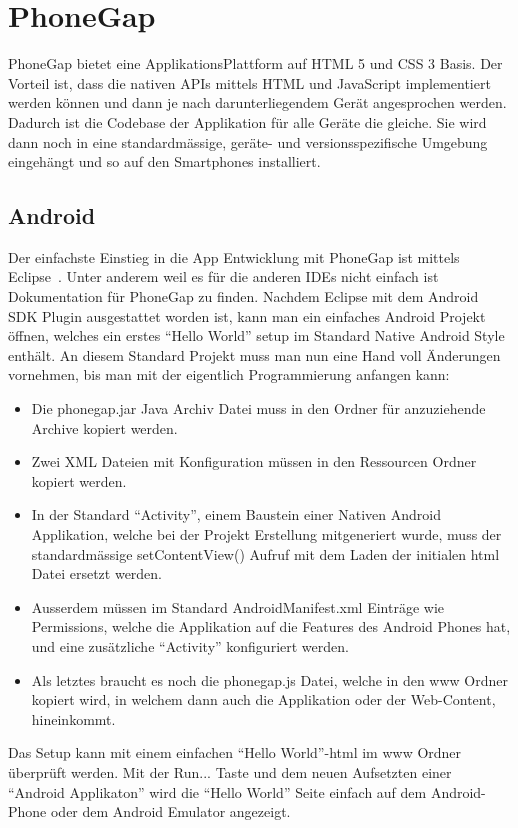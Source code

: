 
\newpage
\section{PhoneGap} %
\label{sec:PhoneGap}
PhoneGap bietet eine ApplikationsPlattform auf HTML 5 und CSS 3 Basis. Der Vorteil ist, dass die nativen APIs mittels HTML und JavaScript implementiert werden können und dann je nach darunterliegendem Gerät angesprochen werden. Dadurch ist die Codebase der Applikation für alle Geräte die gleiche. Sie wird dann noch in eine standardmässige, geräte- und versionsspezifische Umgebung eingehängt und so auf den Smartphones installiert.

\subsection{Android} %
\label{sub:android}

Der einfachste Einstieg in die App Entwicklung mit PhoneGap ist mittels Eclipse~\cite{bib:eclipse}. Unter anderem weil es für die anderen IDEs nicht einfach ist Dokumentation für PhoneGap zu finden. Nachdem Eclipse mit dem Android SDK Plugin ausgestattet worden ist, kann man ein einfaches Android Projekt öffnen, welches ein erstes "`Hello World"' setup im Standard Native Android Style enthält. 
An diesem Standard Projekt muss man nun eine Hand voll Änderungen vornehmen, bis man mit der eigentlich Programmierung anfangen kann:
\begin{itemize}
    \item Die phonegap.jar Java Archiv Datei muss in den Ordner für anzuziehende Archive kopiert werden.
    \item Zwei XML Dateien mit Konfiguration müssen in den Ressourcen Ordner kopiert werden. 
    \item In der Standard "`Activity"', einem Baustein einer Nativen Android Applikation, welche bei der Projekt Erstellung mitgeneriert wurde, muss der standardmässige setContentView() Aufruf mit dem Laden der initialen html Datei ersetzt werden.
    \item Ausserdem müssen im Standard AndroidManifest.xml Einträge wie Permissions, welche die Applikation auf die Features des Android Phones hat, und eine zusätzliche "`Activity"' konfiguriert werden.
    \item Als letztes braucht es noch die phonegap.js Datei, welche in den www Ordner kopiert wird, in welchem dann auch die Applikation oder der Web-Content, hineinkommt.
\end{itemize}
Das Setup kann mit einem einfachen "`Hello World"'-html im www Ordner überprüft werden. Mit der Run... Taste und dem neuen Aufsetzten einer "`Android Applikaton"' wird die "`Hello World"' Seite einfach auf dem Android-Phone oder dem Android Emulator angezeigt.

